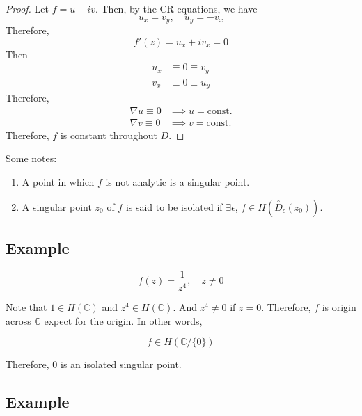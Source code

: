 \documentclass{article}
\newtheorem{one minute paper}[theorem]{One Minute Paper}
\begin{document}
\begin{proof}
    Let $f = u + iv$. Then, by the CR equations, we have 
    \begin{equation}
        u_x = v_y, \quad u_y = -v_x
    \end{equation}
    Therefore, 
    \begin{equation}
        f'(z) = u_x + iv_x = 0
    \end{equation}
    Then 
    \begin{align}
        u_x &\equiv 0 \equiv v_y \\
        v_x &\equiv 0 \equiv u_y
    \end{align}
    Therefore, 
    \begin{align}
        \nabla u \equiv 0 &\implies u = \text{const.}\\
        \nabla v \equiv 0 &\implies v = \text{const.}
    \end{align}
    Therefore, $f$ is constant throughout $D$. 
\end{proof}

Some notes:
\begin{enumerate}
    \item A point in which $f$ is not analytic is a singular point. 
    \item A singular point $z_0$ of $f$ is said to be isolated if $\exists \epsilon$, $f \in H(\overset{\circ}{D}_{\epsilon}(z_0))$.  
\end{enumerate}

\subsection*{Example}

\begin{equation}
    f(z) = \frac{1}{z^4}, \quad z \neq 0
\end{equation}

Note that $1 \in H(\mathbb{C})$ and $z^4 \in H(\mathbb{C})$. And $z^4 \neq 0$ if $z = 0$. Therefore, $f$ is origin across $\mathbb{C}$ expect for the origin. In other words, 

\begin{equation}
    f \in H(\mathbb{C}/\{0\})
\end{equation}

Therefore, $0$ is an isolated singular point. 

\subsection*{Example}
\end{document}
